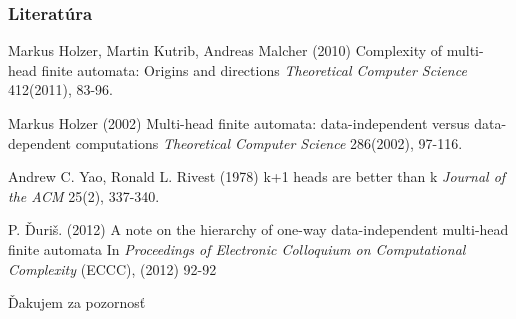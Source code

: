 \documentclass[slovak]{beamer}
\begin{document}
\begin{frame}
\frametitle{Literatúra}
\footnotesize{
\begin{thebibliography}{99}
 Markus Holzer, Martin Kutrib, Andreas Malcher (2010)
\newblock Complexity of multi-head finite automata: Origins and directions
\newblock \emph{Theoretical Computer Science} 412(2011), 83-96.

 Markus Holzer (2002)
\newblock Multi-head finite automata: data-independent versus data-dependent computations
\newblock \emph{Theoretical Computer Science} 286(2002), 97-116.

 Andrew C. Yao, Ronald L. Rivest (1978)
\newblock k+1 heads are better than k
\newblock \emph{Journal of the ACM} 25(2), 337-340.

 P. Ďuriš. (2012)
\newblock A note on the hierarchy of one-way data-independent multi-head finite automata
\newblock In \emph{Proceedings of Electronic Colloquium on Computational Complexity} (ECCC), (2012) 92-92
\end{thebibliography}
}
\end{frame}


\begin{frame}
\Huge{\centerline{Ďakujem za pozornosť}}
\end{frame}

\end{document}
